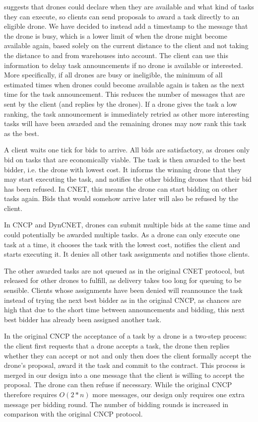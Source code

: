\documentclass[10pt,a4paper,twocolumn]{article}
\begin{document}
\cite{CNET} suggests that drones could declare when they are available and what kind of tasks they can execute, so clients can send proposals to award a task directly to an eligible drone. We have decided to instead add a timestamp to the message that the drone is busy, which is a lower limit of when the drone might become available again, based solely on the current distance to the client and not taking the distance to and from warehouses into account. The client can use this information to delay task announcements if no drone is available or interested. More specifically, if all drones are busy or ineligible, the minimum of all estimated times when drones could become available again is taken as the next time for the task announcement. This reduces the number of messages that are sent by the client (and replies by the drones). If a drone gives the task a low ranking, the task announcement is immediately retried as other more interesting tasks will have been awarded and the remaining drones may now rank this task as the best.

A client waits one tick for bids to arrive. All bids are satisfactory, as drones only bid on tasks that are economically viable. The task is then awarded to the best bidder, i.e. the drone with lowest cost. It informs the winning drone that they may start executing the task, and notifies the other bidding drones that their bid has been refused. In CNET, this means the drone can start bidding on other tasks again. Bids that would somehow arrive later will also be refused by the client.

In CNCP and DynCNET, drones can submit multiple bids at the same time and could potentially be awarded multiple tasks. As a drone can only execute one task at a time, it chooses the task with the lowest cost, notifies the client and starts executing it. It denies all other task assignments and notifies those clients.

The other awarded tasks are not queued as in the original CNET protocol, but released for other drones to fulfill, as delivery takes too long for queuing to be sensible. Clients whose assignments have been denied will reannounce the task instead of trying the next best bidder as in the original CNCP, as chances are high that due to the short time between announcements and bidding, this next best bidder has already been assigned another task. 

In the original CNCP the acceptance of a task by a drone is a two-step process: the client first requests that a drone accepts a task, the drone then replies whether they can accept or not and only then does the client formally accept the drone's proposal, award it the task and commit to the contract. This process is merged in our design into a one message that the client is willing to accept the proposal. The drone can then refuse if necessary. While the original CNCP therefore requires $O(2*n)$ more messages, our design only requires one extra message per bidding round.  The number of bidding rounds is increased in comparison with the original CNCP protocol.
\end{document}
